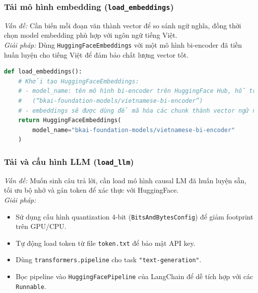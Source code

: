 \documentclass[11pt]{article}
\begin{document}
\subsubsection*{Tải mô hình embedding (\texttt{load\_embeddings})}

\textit{Vấn đề:} Cần biến mỗi đoạn văn thành vector để so sánh ngữ nghĩa, đồng thời chọn model embedding phù hợp với ngôn ngữ tiếng Việt.\\

\textit{Giải pháp:} Dùng \texttt{HuggingFaceEmbeddings} với một mô hình bi‑encoder đã tiền huấn luyện cho tiếng Việt để đảm bảo chất lượng vector tốt.\\

\begin{lstlisting}[language=Python, caption=Tải embedding model với comment giải thích]
def load_embeddings():
    # Khởi tạo HuggingFaceEmbeddings:
    # - model_name: tên mô hình bi-encoder trên HuggingFace Hub, hỗ trợ tiếng Việt
    #   (“bkai-foundation-models/vietnamese-bi-encoder”)
    # - embeddings sẽ được dùng để mã hóa các chunk thành vector ngữ nghĩa
    return HuggingFaceEmbeddings(
        model_name="bkai-foundation-models/vietnamese-bi-encoder"
    )
\end{lstlisting}


\subsubsection*{Tải và cấu hình LLM (\texttt{load\_llm})}

\textit{Vấn đề:} Muốn sinh câu trả lời, cần load mô hình causal LM đã huấn luyện sẵn, tối ưu bộ nhớ và gán token để xác thực với HuggingFace.\\

\noindent\textit{Giải pháp:}
\begin{itemize}
    \item Sử dụng cấu hình quantization 4-bit (\texttt{BitsAndBytesConfig}) để giảm footprint trên GPU/CPU.
    \item Tự động load token từ file \texttt{token.txt} để bảo mật API key.
    \item Dùng \texttt{transformers.pipeline} cho task \texttt{"text-generation"}.
    \item Bọc pipeline vào \texttt{HuggingFacePipeline} của LangChain để dễ tích hợp với các \texttt{Runnable}.
\end{itemize}
\end{document}
